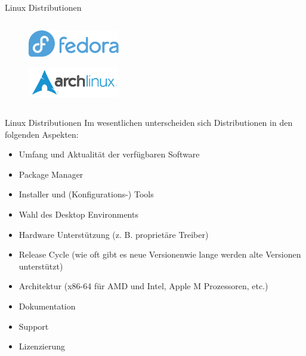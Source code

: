 \documentclass{setbeamer}
\begin{document}
\begin{frame}{Linux Distributionen}
\begin{columns}
\begin{column}{0.5\textwidth}
            \begin{figure}[h]
                \includegraphics[width=4cm, keepaspectratio]{./resources/fedora.png}
            \end{figure}
            
            \begin{figure}[h]
                \includegraphics[width=4cm, keepaspectratio]{./resources/arch.png}
            \end{figure}
        \end{column}
    \end{columns}
\end{frame}

\begin{frame}{Linux Distributionen}
    Im wesentlichen unterscheiden sich Distributionen in den folgenden Aspekten:
    \begin{itemize}
        \item Umfang und Aktualität der verfügbaren Software
        \item Package Manager
        \item Installer und (Konfigurations-) Tools %
        \item Wahl des Desktop Environments %
        \item Hardware Unterstützung (z. B. proprietäre Treiber) %
        \item Release Cycle (wie oft gibt es neue Versionen\textemdash wie lange werden alte Versionen unterstützt)
        \item Architektur (x86-64 für AMD und Intel, Apple M Prozessoren, etc.) %
        \item Dokumentation %
        \item Support %
        \item Lizenzierung
    \end{itemize}
\end{frame}
\end{document}
